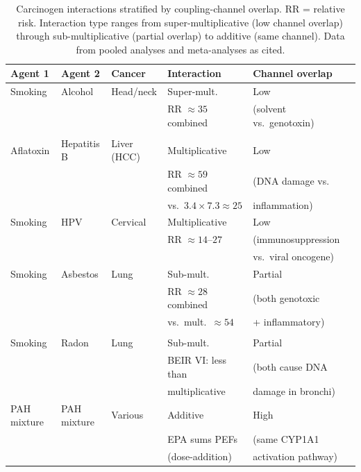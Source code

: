 \documentclass[11pt]{article}
\theoremstyle{definition}
\theoremstyle{remark}
\begin{document}
\begin{enumerate}
\begin{table}[ht]
\centering
\small
\caption{Carcinogen interactions stratified by coupling-channel
overlap. RR = relative risk. Interaction type ranges from
super-multiplicative (low channel overlap) through sub-multiplicative
(partial overlap) to additive (same channel). Data from pooled
analyses and meta-analyses as cited.}
\label{tab:carcinogen-interactions}
\begin{tabular}{@{}llllll@{}}
\toprule
Agent 1 & Agent 2 & Cancer & Interaction & Channel overlap \\
\midrule
Smoking & Alcohol & Head/neck &
  Super-mult. &
  Low \\
 & & & RR $\approx 35$ combined & (solvent vs.\ genotoxin) \\
 & & & \cite{Freedman2007} & \\[4pt]
Aflatoxin & Hepatitis B & Liver (HCC) &
  Multiplicative &
  Low \\
 & & & RR $\approx 59$ combined & (DNA damage vs. \\
 & & & vs.\ $3.4 \times 7.3 \approx 25$ & inflammation) \\[4pt]
Smoking & HPV & Cervical &
  Multiplicative &
  Low \\
 & & & RR $\approx 14$--$27$ & (immunosuppression \\
 & & & \cite{Herrero2003} & vs.\ viral oncogene) \\[4pt]
Smoking & Asbestos & Lung &
  Sub-mult. &
  Partial \\
 & & & RR $\approx 28$ combined & (both genotoxic \\
 & & & vs.\ mult.\ $\approx 54$ & + inflammatory) \\
 & & & \cite{Lee2006} & \\[4pt]
Smoking & Radon & Lung &
  Sub-mult. &
  Partial \\
 & & & BEIR VI: less than & (both cause DNA \\
 & & & multiplicative & damage in bronchi) \\[4pt]
PAH mixture & PAH mixture & Various &
  Additive &
  High \\
 & & & EPA sums PEFs & (same CYP1A1 \\
 & & & (dose-addition) & activation pathway) \\
\bottomrule
\end{tabular}
\end{table}


\end{enumerate}
\end{document}
